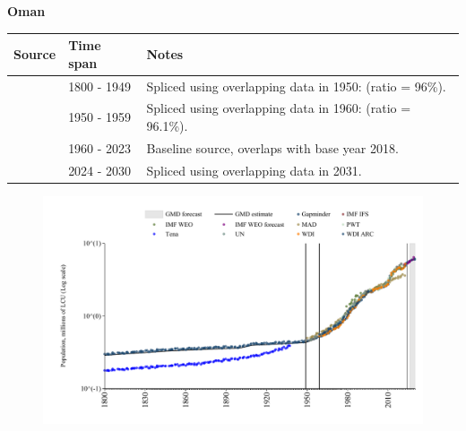\documentclass[12pt,a4paper,landscape]{article}
\begin{document}
\begin{adjustbox}{max totalsize={\paperwidth}{\paperheight},center}
\begin{minipage}[t][\textheight][t]{\textwidth}
\vspace*{0.5cm}
{}
\begin{center}
{\Large\bfseries Oman}
\end{center}
\vspace{0.5cm}
\begin{table}[H]
\centering
\small
\begin{tabular}{|l|l|l|}
\hline
\textbf{Source} & \textbf{Time span} & \textbf{Notes} \\
\hline
\rowcolor{white}\cite{Gapminder}& 1800 - 1949 &Spliced using overlapping data in 1950: (ratio = 96\%).\\
\rowcolor{lightgray}\cite{IMF_IFS}& 1950 - 1959 &Spliced using overlapping data in 1960: (ratio = 96.1\%).\\
\rowcolor{white}\cite{WDI}& 1960 - 2023 &Baseline source, overlaps with base year 2018.\\
\rowcolor{lightgray}\cite{Gapminder}& 2024 - 2030 &Spliced using overlapping data in 2031.\\
\hline
\end{tabular}
\end{table}
\begin{figure}[H]
\centering
\includegraphics[width=\textwidth,height=0.6\textheight,keepaspectratio]{graphs/OMN_pop.pdf}
\end{figure}
\end{minipage}
\end{adjustbox}
\end{document}

